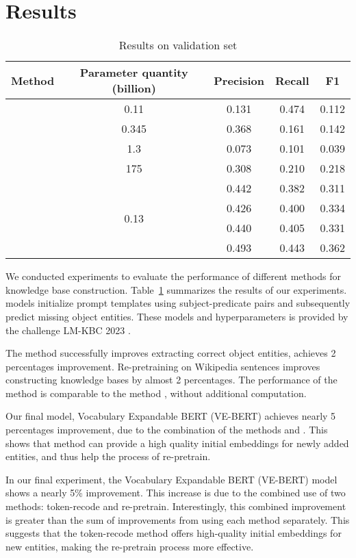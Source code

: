 \documentclass[]{ceurart}
\begin{document}
\section{Results}
\begin{table}

\centering

\caption{Results on validation set }
\label{tab-method}
\begin{tabular}{|c|c|c|c|c|}
\hline
Method  &   Parameter quantity (billion)&Precision   &   Recall  & F1 \\
\hline
&  0.11&0.131& 0.474 & 0.112 \\
 & 0.345& 0.368& 0.161&0.142\\
&  1.3&0.073 & 0.101 &  0.039  \\
 &  175&0.308& 0.210&0.218\\
\hline
&   \multirow{4}{*}{ 
 0.13 }  &0.442 & 0.382 &  0.311 \\
&  & 0.426 &  0.400 & 0.334 \\
 &  &0.440& 0.405&0.331\\
&     &0.493     &0.443   &  0.362  \\
\hline
\end{tabular}
\end{table}


We conducted experiments to evaluate the performance of different methods for knowledge base construction. Table~\ref{tab-method} summarizes the results of our experiments.   models initialize prompt templates using subject-predicate pairs and subsequently predict missing object entities. These models and hyperparameters is provided by the challenge LM-KBC 2023 \cite{singhania_lm-kbc_2023}.
 




 The  method successfully improves extracting correct object entities, achieves 2 percentages improvement.   Re-pretraining on Wikipedia sentences improves constructing knowledge bases by almost 2 percentages. The performance of the method  is comparable to the method , without additional computation. 

Our final model, Vocabulary Expandable BERT (VE-BERT) achieves nearly 5 percentages improvement, due to the combination of the methods  and . This shows that  method can provide a high quality initial embeddings for newly added entities, and thus help the process of re-pretrain. 


In our final experiment, the Vocabulary Expandable BERT (VE-BERT) model shows a nearly 5\% improvement. This increase is due to the combined use of two methods:  token-recode and re-pretrain. Interestingly, this combined improvement is greater than the sum of improvements from using each method separately. This suggests that the token-recode  method offers high-quality initial embeddings for new entities, making the re-pretrain process more effective.
\end{document}
